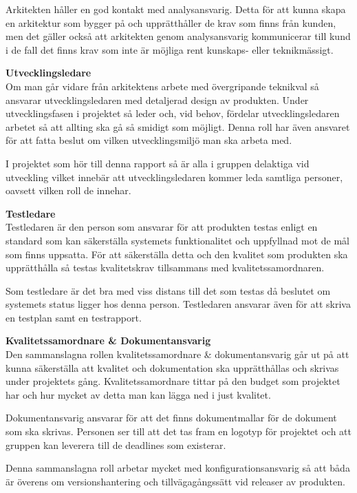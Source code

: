 \documentclass[a4paper,10pt]{article}
\begin{document}
Arkitekten håller en god kontakt med analysansvarig. Detta för att kunna skapa en arkitektur som bygger på och upprätthåller de krav som finns från kunden, men det gäller också att arkitekten genom analysansvarig kommunicerar till kund i de fall det finns krav som inte är möjliga rent kunskaps- eller teknikmässigt.

\textbf{Utvecklingsledare}\\
Om man går vidare från arkitektens arbete med övergripande teknikval så ansvarar utvecklingsledaren med detaljerad design av produkten. Under utvecklingsfasen i projektet så leder och, vid behov, fördelar utvecklingsledaren arbetet så att allting ska gå så smidigt som möjligt. Denna roll har även ansvaret för att fatta beslut om vilken utvecklingsmiljö man ska arbeta med. 

I projektet som hör till denna rapport så är alla i gruppen delaktiga vid utveckling vilket innebär att utvecklingsledaren kommer leda samtliga personer, oavsett vilken roll de innehar.

\textbf{Testledare}\\
Testledaren är den person som ansvarar för att produkten testas enligt en standard som kan säkerställa systemets funktionalitet och uppfyllnad mot de mål som finns uppsatta. För att säkerställa detta och den kvalitet som produkten ska upprätthålla så testas kvalitetskrav tillsammans med kvalitetssamordnaren.

Som testledare är det bra med viss distans till det som testas då beslutet om systemets status ligger hos denna person. Testledaren ansvarar även för att skriva en testplan samt en testrapport.

\textbf{Kvalitetssamordnare \& Dokumentansvarig}\\
Den sammanslagna rollen kvalitetssamordnare \& dokumentansvarig går ut på att kunna säkerställa att kvalitet och dokumentation ska upprätthållas och skrivas under projektets gång. Kvalitetssamordnare tittar på den budget som projektet har och hur mycket av detta man kan lägga ned i just kvalitet.

Dokumentansvarig ansvarar för att det finns dokumentmallar för de dokument som ska skrivas. Personen ser till att det tas fram en logotyp för projektet och att gruppen kan leverera till de deadlines som existerar. 

Denna sammanslagna roll arbetar mycket med konfigurationsansvarig så att båda är överens om versionshantering och tillvägagångssätt vid releaser av produkten.
\end{document}
